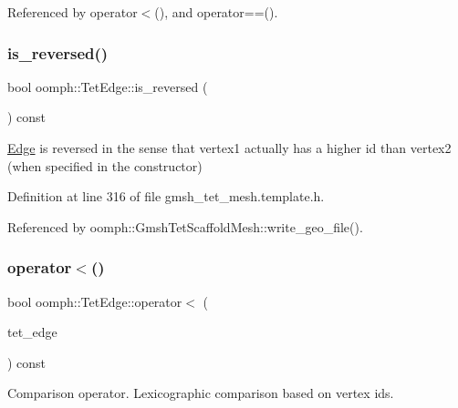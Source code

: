 Referenced by operator$<$(), and operator==().

\mbox{\label{classoomph_1_1TetEdge_a9a124de5c191e1b0e43ed92c2a867c55}} 
\subsubsection{\texorpdfstring{is\+\_\+reversed()}{is\_reversed()}}
{\footnotesize\ttfamily bool oomph\+::\+Tet\+Edge\+::is\+\_\+reversed (\begin{DoxyParamCaption}{ }\end{DoxyParamCaption}) const\hspace{0.3cm}{\ttfamily [inline]}}



\hyperlink{classoomph_1_1Edge}{Edge} is reversed in the sense that vertex1 actually has a higher id than vertex2 (when specified in the constructor) 



Definition at line 316 of file gmsh\+\_\+tet\+\_\+mesh.\+template.\+h.



Referenced by oomph\+::\+Gmsh\+Tet\+Scaffold\+Mesh\+::write\+\_\+geo\+\_\+file().

\mbox{\label{classoomph_1_1TetEdge_ac8d4b17db0a1e741664d8029ffb419b9}} 
\subsubsection{\texorpdfstring{operator$<$()}{operator<()}}
{\footnotesize\ttfamily bool oomph\+::\+Tet\+Edge\+::operator$<$ (\begin{DoxyParamCaption}\item[{const \hyperlink{classoomph_1_1TetEdge}{Tet\+Edge} \&}]{tet\+\_\+edge }\end{DoxyParamCaption}) const\hspace{0.3cm}{\ttfamily [inline]}}



Comparison operator. Lexicographic comparison based on vertex ids. 



